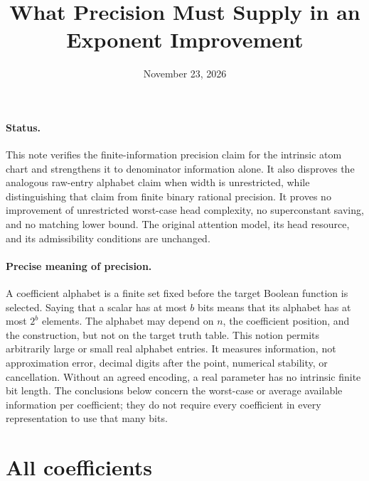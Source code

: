 \documentclass[11pt]{article}
\begin{document}
\title{What Precision Must Supply in an Exponent Improvement}
\author{}
\date{November 23, 2026}
\maketitle

\paragraph{Status.}
This note verifies the finite-information precision claim for the
intrinsic atom chart and strengthens it to denominator information alone.
It also disproves the analogous raw-entry alphabet claim when width
is unrestricted, while distinguishing that claim from finite binary
rational precision.
It proves no improvement of unrestricted worst-case head complexity,
no superconstant saving, and no matching lower bound.
The original attention model, its head resource, and its admissibility
conditions are unchanged.

\paragraph{Precise meaning of precision.}
A coefficient alphabet is a finite set fixed before the target Boolean
function is selected. Saying that a scalar has at most $b$ bits means
that its alphabet has at most $2^b$ elements. The alphabet may depend
on $n$, the coefficient position, and the construction, but not on
the target truth table. This notion permits arbitrarily large or small
real alphabet entries. It measures information, not approximation error,
decimal digits after the point, numerical stability, or cancellation.
Without an agreed encoding, a real parameter has no intrinsic finite
bit length. The conclusions below concern the worst-case or average
available information per coefficient; they do not require every
coefficient in every representation to use that many bits.

\section{All coefficients}
\end{document}
